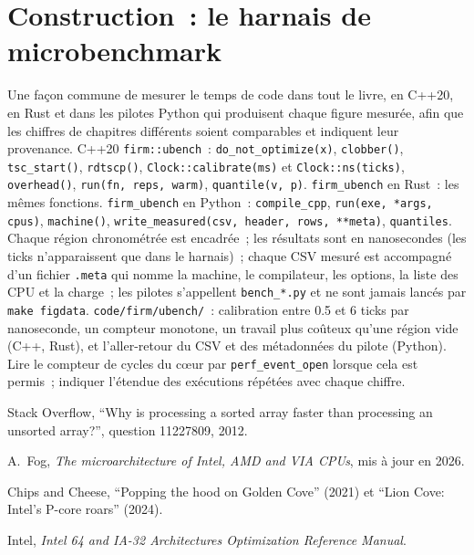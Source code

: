 \section{Construction~: le harnais de microbenchmark}\label{bld:ll:cpu-microarchitecture:ubench}

\begin{build}
 Une façon commune de mesurer le temps de code dans tout le livre, en C++20, en Rust et dans les pilotes Python qui produisent chaque
figure mesurée, afin que les chiffres de chapitres différents soient comparables et indiquent leur provenance.
 C++20 \texttt{firm::ubench}~: \texttt{do\_not\_optimize(x)}, \texttt{clobber()},
\texttt{tsc\_start()}, \texttt{rdtscp()}, \texttt{Clock::calibrate(ms)} et \texttt{Clock::ns(ticks)},
\texttt{overhead()}, \texttt{run(fn, reps, warm)}, \texttt{quantile(v, p)}. \texttt{firm\_ubench} en Rust~: les mêmes
fonctions. \texttt{firm\_ubench} en Python~: \texttt{compile\_cpp}, \texttt{run(exe, *args, cpus)},
\texttt{machine()}, \texttt{write\_measured(csv, header, rows, **meta)}, \texttt{quantiles}.
 Chaque région chronométrée est encadrée~; les résultats sont en nanosecondes (les ticks n'apparaissent que dans le harnais)~; chaque CSV mesuré
est accompagné d'un fichier \texttt{.meta} qui nomme la machine, le compilateur, les options, la liste des CPU et la charge~; les pilotes s'appellent
\texttt{bench\_*.py} et ne sont jamais lancés par \texttt{make figdata}.
 \texttt{code/firm/ubench/}~: calibration entre 0.5 et 6 ticks par nanoseconde, un compteur monotone, un travail
plus coûteux qu'une région vide (C++, Rust), et l'aller-retour du CSV et des métadonnées du pilote (Python).
 Lire le compteur de cycles du cœur par \texttt{perf\_event\_open} lorsque cela est permis~; indiquer l'étendue des
exécutions répétées avec chaque chiffre.
\end{build}

\begin{omsources}
\item Stack Overflow, ``Why is processing a sorted array faster than processing an unsorted array?'', question
11227809, 2012.
\item A.~Fog, \emph{The microarchitecture of Intel, AMD and VIA CPUs}, mis à jour en 2026.
\item Chips and Cheese, ``Popping the hood on Golden Cove'' (2021) et ``Lion Cove: Intel's P-core roars'' (2024).
\item Intel, \emph{Intel 64 and IA-32 Architectures Optimization Reference Manual}.
\end{omsources}

